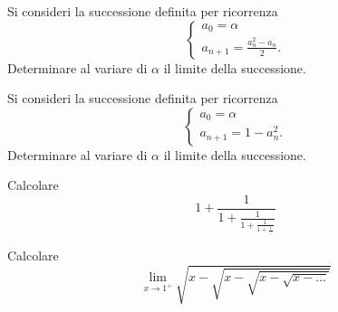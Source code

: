 \begin{exercise}
  Si consideri la successione definita per ricorrenza
  \[
  \begin{cases}
    a_0 = \alpha\\
    a_{n+1} = \frac{a_n^2-a_n}{2}.
  \end{cases}
  \]
  Determinare al variare di $\alpha$ il limite della successione.
\end{exercise}

\begin{exercise}
  Si consideri la successione definita per ricorrenza
  \[
  \begin{cases}
    a_0 = \alpha \\
    a_{n+1} = 1 - a_n^2.
  \end{cases}
  \]
  Determinare al variare di $\alpha$ il limite della successione.
\end{exercise}

\begin{exercise}
Calcolare
\[
 1 + \frac{1}{1+\frac{1}{1+\frac{1}{1+\frac{1}{\dots}}}}
\]
\end{exercise}

\begin{exercise}
Calcolare
\[
  \lim_{x\to 1^+} \sqrt{x-\sqrt{x- \sqrt{x-\sqrt{x - \dots}}}}
\]
\end{exercise}

